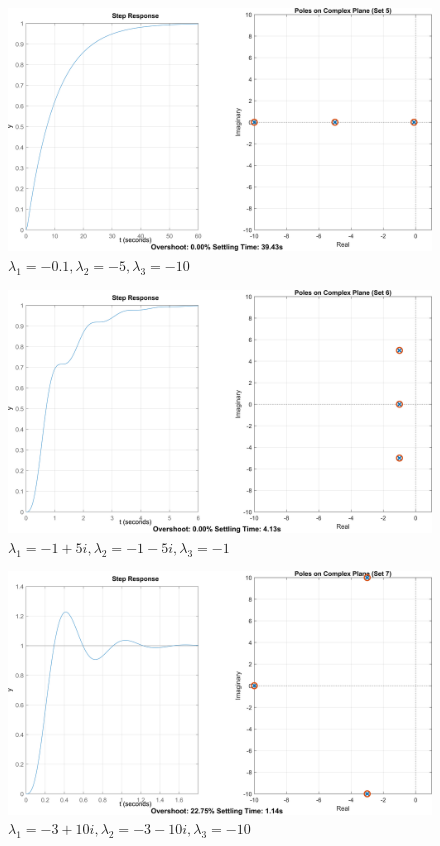 \begin{figure}[H]
    \centering
    \includegraphics[width=1\textwidth, trim={0cm 0cm 0cm 0cm}]{../images/4_5.png}
    \caption{$\lambda_1 = -0.1, \lambda_2 = -5, \lambda_3 = -10$}
\end{figure}

\begin{figure}[H]
    \centering
    \includegraphics[width=1\textwidth, trim={0cm 0cm 0cm 0cm}]{../images/4_6.png}
    \caption{$\lambda_1 = -1+5i, \lambda_2 = -1-5i, \lambda_3 = -1$}
\end{figure}

\begin{figure}[H]
    \centering
    \includegraphics[width=1\textwidth, trim={0cm 0cm 0cm 0cm}]{../images/4_7.png}
    \caption{$\lambda_1 = -3+10i, \lambda_2 = -3-10i, \lambda_3 = -10$}
\end{figure}

